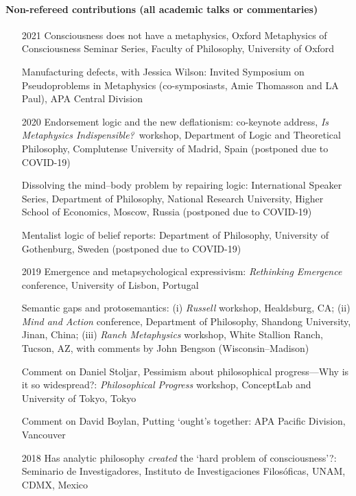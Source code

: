 \documentclass[12pt]{article}
\begin{document}
\paragraph{Non-refereed contributions (all academic talks or commentaries)}
\begin{itemize}
	
	\item[2021] Consciousness does not have a metaphysics, Oxford Metaphysics of Consciousness Seminar Series, Faculty of Philosophy, University of Oxford


	Manufacturing defects, with Jessica Wilson: Invited Symposium on Pseudoproblems in Metaphysics (co-symposiasts, Amie Thomasson and LA Paul), APA Central Division
	
	\item[2020] Endorsement logic and the new deflationism: co-keynote address, \emph{Is Metaphysics Indispensible?}\ workshop, Department of Logic and Theoretical Philosophy, Complutense University of Madrid, Spain (postponed due to COVID-19)

	Dissolving the mind--body problem by repairing logic: International Speaker Series, Department of Philosophy, National Research University, Higher School of Economics, Moscow, Russia (postponed due to COVID-19)

	Mentalist logic of belief reports: Department of Philosophy, University of Gothenburg, Sweden (postponed due to COVID-19)
	
	\item[2019] Emergence and metapsychological expressivism: \emph{Rethinking Emergence} conference, University of Lisbon, Portugal
	
	Semantic gaps and protosemantics: (i) \emph{Russell} workshop, Healdsburg, CA; (ii) \emph{Mind and Action} conference, Department of Philosophy, Shandong University, Jinan, China; (iii) \emph{Ranch Metaphysics} workshop, White Stallion Ranch, Tucson, AZ, with comments by John Bengson (Wisconsin--Madison)
	
	Comment on Daniel Stoljar, Pessimism about philosophical progress---Why is it so widespread?: \emph{Philosophical Progress} workshop, ConceptLab and University of Tokyo, Tokyo
	
	Comment on David Boylan, Putting `ought's together: APA Pacific Division, Vancouver
	
	\item[2018] Has analytic philosophy \emph{created} the `hard problem of consciousness'?: Seminario de Investigadores, Instituto de Investigaciones Filos\'oficas, UNAM, CDMX, Mexico 
	

\end{itemize}
\end{document}
